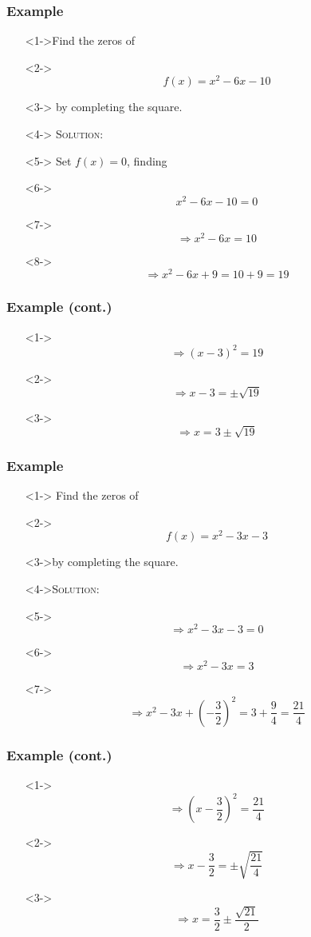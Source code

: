 \documentclass[handout]{beamer}
\begin{document}
\begin{frame}
	\frametitle{Example}
	\begin{enumerate}
		\item[]<1->Find the zeros of
		\item[]<2-> \[ f(x)=x^{2}-6x-10 \]
		\item[]<3-> by completing the square.
		\item[]<4-> \textsc{Solution:}
		\item[]<5-> Set $f(x)=0$, finding
		\item[]<6-> \[ x^{2}-6x-10=0 \]
		\item[]<7-> \[ \Rightarrow x^{2}-6x=10 \]
		\item[]<8->\[ \Rightarrow x^{2}-6x+9=10+9=19 \]
	\end{enumerate}
\end{frame}

\begin{frame}
	\frametitle{Example (cont.)}
	\begin{enumerate}
		\item[]<1->\[ \Rightarrow (x-3)^{2}=19 \]
		\item[]<2->\[ \Rightarrow x-3=\pm \sqrt{19} \]
		\item[]<3->\[ \Rightarrow x=3 \pm \sqrt{19} \]
	\end{enumerate}
\end{frame}

\begin{frame}
	\frametitle{Example}
	\begin{enumerate}
		\item[]<1-> Find the zeros of
		\item[]<2->\[ f(x)=x^{2}-3x-3 \]
		\item[]<3->by completing the square.
		\item[]<4->\textsc{Solution:}
		\item[]<5-> \[ \Rightarrow x^{2}-3x-3=0 \]
		\item[]<6-> \[ \Rightarrow x^{2}-3x=3 \]
		\item[]<7-> \[ \Rightarrow x^{2}-3x+\left( -\frac{3}{2}\right)^{2}=3+\frac{9}{4}=\frac{21}{4} \]
	\end{enumerate}
\end{frame}

\begin{frame}
	\frametitle{Example (cont.)}
	\begin{enumerate}
		\item[]<1-> \[ \Rightarrow \left( x-\frac{3}{2} \right)^{2}=\frac{21}{4} \]
		\item[]<2-> \[ \Rightarrow x-\frac{3}{2}=\pm \sqrt{\frac{21}{4}} \]
		\item[]<3->\[ \Rightarrow x=\frac{3}{2} \pm \frac{\sqrt{21}}{2} \]
	\end{enumerate}
\end{frame}
\end{document}
